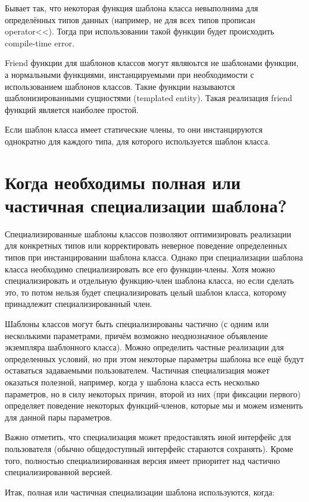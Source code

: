 \documentclass[a4paper,12pt]{article}	%
\begin{document}
	Бывает так, что некоторая функция шаблона класса невыполнима для определённых типов данных (например, не для всех типов прописан operator<<). Тогда при использовании такой функции будет происходить compile-time error.
	
	Friend функции для шаблонов классов могут являюьтся не шаблонами функции, а нормальными функциями, инстанцируемыми при необходимости с использованием шаблонов классов. Такие функции называются шаблонизированными сущностями (templated entity). Такая реализация friend функций является наиболее простой.
	
	Если шаблон класса имеет статические члены, то они инстанцируются однократно для каждого типа, для которого используется шаблон класса.	 

\newpage

\section{Когда необходимы полная или частичная специализации шаблона?}
	
	Специализированные шаблоны классов позволяют оптимизировать реализации для конкретных типов или корректировать неверное поведение определенных типов при инстанцировании шаблона класса. Однако при специализации шаблона класса необходимо специализировать все его функции-члены. Хотя можно специализировать и отдельную функцию-член шаблона класса, но если сделать это, то потом нельзя будет специализировать целый шаблон класса, которому принадлежит специализированный член.
	
	Шаблоны классов могут быть специализированы частично (с одним или несколькими параметрами, причём возможно неоднозначное объявление экземпляра шаблонного класса). Можно определить частные реализации для определенных условий, но при этом некоторые параметры шаблона все ещё будут оставаться задаваемыми пользователем. Частичная специализация может оказаться полезной, например, когда у шаблона класса есть несколько параметров, но в силу некоторых причин, второй из них (при фиксации первого) определяет поведение некоторых функций-членов, которые мы и можем изменить для данной пары параметров.
	
	Важно отметить, что специализация может предоставлять иной интерфейс для пользователя (обычно общедоступный интерфейс стараются сохранять). Кроме того, полностью специализированная версия имеет приоритет над частично специализированной версией.
	
	Итак, полная или частичная специализации шаблона используются, когда:
	
\end{document}
